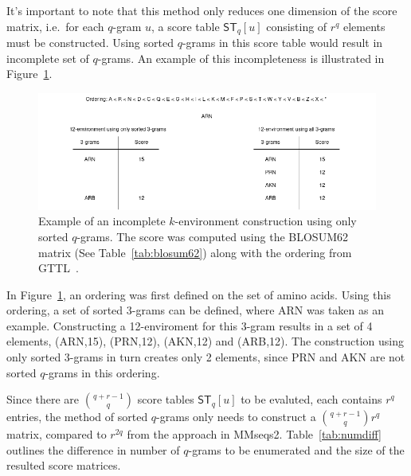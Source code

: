 \documentclass[twoside,a4paper,bsc]{master}
\newcommand{\Qgram}[1]{\(#1\)-gram}
\newcommand{\Scoretablename}[0]{\mathsf{ST}}
\newcommand{\Scoretable}[2]{\Scoretablename_{#1}[#2]}
\begin{document}
It's important to note that this method only reduces one dimension of the score 
matrix, i.e.\ for each \Qgram{q} \(u\), a score table \(\Scoretable{q}{u}\)
consisting of \(r^q\) elements must be constructed. Using sorted \Qgram{q}s in 
this score table would result in incomplete set of \Qgram{q}s. An example of
this incompleteness is illustrated in Figure~\ref{fig:sorted}.

\begin{figure}[t]
\begin{center}
\includegraphics[scale=0.6]{graphics/sorted.png}
\end{center}
\caption{Example of an incomplete \(k\)-environment construction using only 
sorted \Qgram{q}s. The score was computed using the BLOSUM62 
matrix (See Table~\ref{tab:blosum62}) along with the ordering from GTTL~\cite{gttl}.}
\label{fig:sorted}
\end{figure}

In Figure~\ref{fig:sorted}, an ordering was first defined on the set of amino 
acids. Using this ordering, a set of sorted \Qgram{3}s can be defined, where ARN
was taken as an example. Constructing a 12-enviroment for this \Qgram{3} results
in a set of 4 elements, (ARN,15), (PRN,12), (AKN,12) and (ARB,12). The 
construction using only sorted \Qgram{3}s in turn creates only 2 elements, since
PRN and AKN are not sorted \Qgram{q}s in this ordering. 

Since there are \(\binom{q+r-1}{q}\) score tables 
\(\Scoretable{q}{u}\) to be evaluted, each contains \(r^q\) entries, the method 
of sorted \Qgram{q}s only needs to construct a \(\binom{q+r-1}{q}r^q\) matrix, 
compared to \(r^{2q}\) from the approach in MMseqs2. Table~\ref{tab:numdiff} 
outlines the difference in number of \Qgram{q}s to be enumerated and the size of
the resulted score matrices. 
\end{document}
